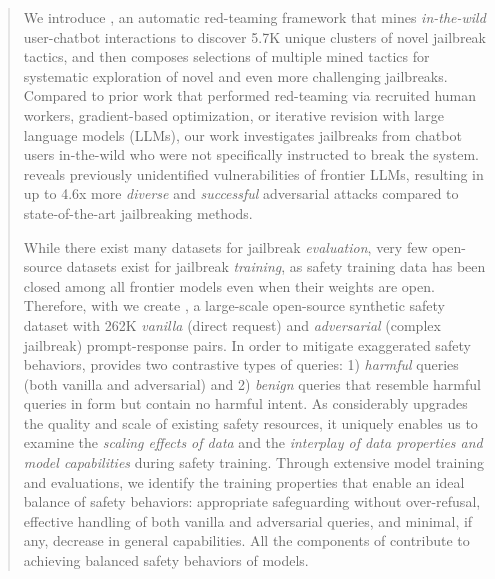 \begin{abstract}

We introduce \method, an automatic red-teaming framework that mines \textit{in-the-wild} user-chatbot interactions to discover 5.7K unique clusters of novel jailbreak tactics, and then composes selections of multiple mined tactics for systematic exploration of novel and even more challenging jailbreaks.
Compared to prior work that performed red-teaming via recruited human workers, gradient-based optimization, or iterative revision with large language models (LLMs), our work investigates jailbreaks from chatbot users in-the-wild who were not specifically instructed to break the system. \method reveals previously unidentified vulnerabilities of frontier LLMs, resulting in up to 4.6x more \emph{diverse} and \emph{successful} adversarial attacks compared to state-of-the-art jailbreaking methods.

While there exist many datasets for jailbreak \emph{evaluation}, very few open-source datasets exist for jailbreak \emph{training}, as safety training data has been closed among all frontier models even when their weights are open. Therefore, with \method we create \dataset, a large-scale open-source synthetic safety dataset with 262K \textit{vanilla} (direct request) and \textit{adversarial} (complex jailbreak) prompt-response pairs. In order to mitigate exaggerated safety behaviors, 
\dataset provides two contrastive types of queries: 1) \textit{harmful} queries 
(both vanilla and adversarial) and 
2) \textit{benign} queries that resemble harmful queries in form but contain no harmful intent. As \dataset considerably upgrades the quality and scale of existing safety resources, it uniquely enables us to examine the \textit{scaling effects of data} and the \textit{interplay of data properties and model capabilities} during safety training. Through extensive model training and evaluations, we identify the training properties that enable an ideal balance of safety behaviors: appropriate safeguarding without over-refusal, effective handling of both vanilla and adversarial queries, and minimal, if any, decrease in general capabilities. All the components of \dataset contribute to achieving balanced safety behaviors of models.

\end{abstract}
